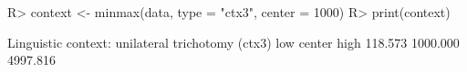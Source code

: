\begin{Schunk}
% --begin: "minmax2"
\begin{Sinput}
R> context <- minmax(data, type = "ctx3", center = 1000)
R> print(context)
\end{Sinput}
\begin{Soutput}
Linguistic context: unilateral trichotomy (ctx3)
     low   center     high 
 118.573 1000.000 4997.816 
\end{Soutput}
% --end: "minmax2"
\end{Schunk}
